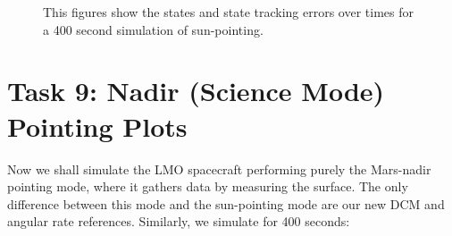 \documentclass[paper]{aiaaNew}
\begin{document}
\begin{figure}[!htbp] 
\centering     %
{}
\caption{This figures show the states and state tracking errors over times for a 400 second simulation of sun-pointing.}
\end{figure}





\section*{Task 9: Nadir (Science Mode) Pointing Plots}
Now we shall simulate the LMO spacecraft performing purely the Mars-nadir pointing mode, where it gathers data by measuring the surface. The only difference between this mode and the sun-pointing mode are our new DCM and angular rate references. Similarly, we simulate for 400 seconds: 
\end{document}
